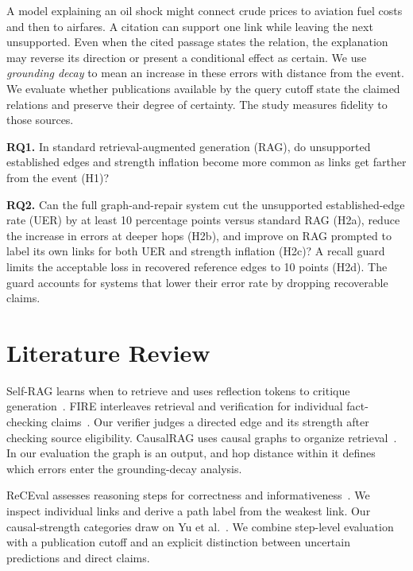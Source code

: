 \documentclass[11pt,a4paper]{article}
\newcommand{\runninglabel}{}
\newcommand{\reportpage}[1]{\newpage\renewcommand{\runninglabel}{#1}}
\begin{document}
A model explaining an oil shock might connect crude prices to aviation
fuel costs and then to airfares. A citation can support one link while
leaving the next unsupported. Even when the cited passage states the
relation, the explanation may reverse its direction or present a
conditional effect as certain. We use \emph{grounding decay} to mean an
increase in these errors with distance from the event. We evaluate
whether publications available by the query cutoff state the claimed
relations and preserve their degree of certainty. The study measures
fidelity to those sources.

\textbf{RQ1.} In standard retrieval-augmented generation (RAG), do
unsupported established edges and strength inflation become more common
as links get farther from the event (H1)?

\textbf{RQ2.} Can the full graph-and-repair system cut the unsupported
established-edge rate (UER) by at least 10 percentage points versus
standard RAG (H2a), reduce the increase in errors at deeper hops (H2b),
and improve on RAG prompted to label its own links for both UER and
strength inflation (H2c)? A recall guard limits the acceptable loss in
recovered reference edges to 10 points (H2d). The guard accounts for
systems that lower their error rate by dropping recoverable claims.

\reportpage{Background and Data}

\section{Literature Review}\label{literature-review}

Self-RAG learns when to retrieve and uses reflection tokens to critique
generation~\cite{asai2024}. FIRE interleaves retrieval and verification for
individual fact-checking claims~\cite{xie2025}. Our verifier
judges a directed edge and its strength after checking source eligibility.
CausalRAG uses causal graphs to organize retrieval~\cite{wang2025}. In
our evaluation the graph is an output, and hop distance within it defines
which errors enter the grounding-decay analysis.

ReCEval assesses reasoning steps for correctness and informativeness~\cite{prasad2023}.
We inspect individual links and derive a path label from the weakest
link. Our causal-strength categories draw on Yu et al.~\cite{yu2019}.
We combine step-level evaluation with a publication cutoff and an
explicit distinction between uncertain predictions and direct claims.
\end{document}
